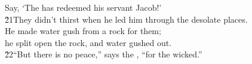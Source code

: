 \begin{poetry}
\poemll    Say, `The  has redeemed his servant Jacob!' \\
\poeml \v{21}They didn't thirst when he led him through the desolate places. \\
\poemll    He made water gush from a rock for them; \\
\poemlll       he split open the rock, and water gushed out. \\
\poeml \v{22}``But there is no peace,'' says the , ``for the wicked.''
\end{poetry}

